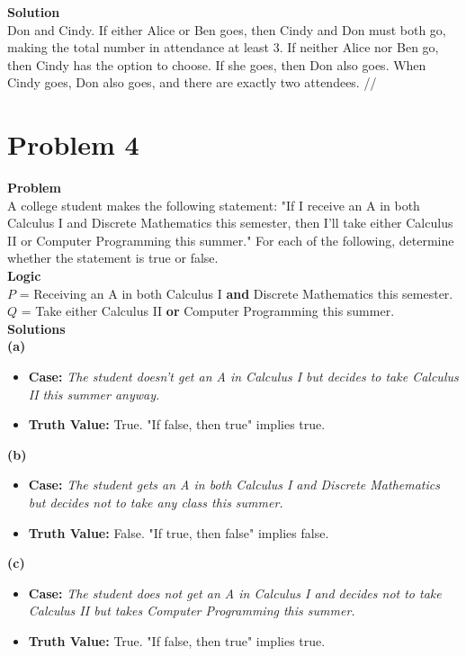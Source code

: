 \documentclass[11pt]{article}
\begin{document}
\textbf{Solution}\\
Don and Cindy. If either Alice or Ben goes, then Cindy and Don must both go, making the total number in attendance at least 3. If neither Alice nor Ben go, then Cindy has the option to choose. If she goes, then Don also goes. When Cindy goes, Don also goes, and there are exactly two attendees. //\\




\newpage


\section*{Problem 4}

\textbf{Problem}\\
A college student makes the following statement: "If I receive an A in both Calculus I and Discrete Mathematics this semester, then I’ll take either Calculus II or Computer Programming this summer." For each of the following, determine whether the statement is true or false.\\

\textbf{Logic}\\
$P$ = Receiving an A in both Calculus I \textbf{and} Discrete Mathematics this semester.\\
$Q$ = Take either Calculus II \textbf{or} Computer Programming this summer.\\

\textbf{Solutions}\\
\textbf{(a)}
\begin{itemize}
    \item \textbf{Case:} \textit{The student doesn’t get an A in Calculus I but decides to take Calculus II this summer anyway.}
    \item \textbf{Truth Value:}  True. "If false, then true" implies true.
\end{itemize}

\textbf{(b)}
\begin{itemize}
    \item \textbf{Case:} \textit{The student gets an A in both Calculus I and Discrete Mathematics but decides not to take any class this summer.}
    \item \textbf{Truth Value:}  False. "If true, then false" implies false.
\end{itemize}

\textbf{(c)}
\begin{itemize}
    \item \textbf{Case:} \textit{The student does not get an A in Calculus I and decides not to take Calculus II but takes Computer Programming this summer.}
    \item \textbf{Truth Value:}  True. "If false, then true" implies true.
\end{itemize}
\end{document}
